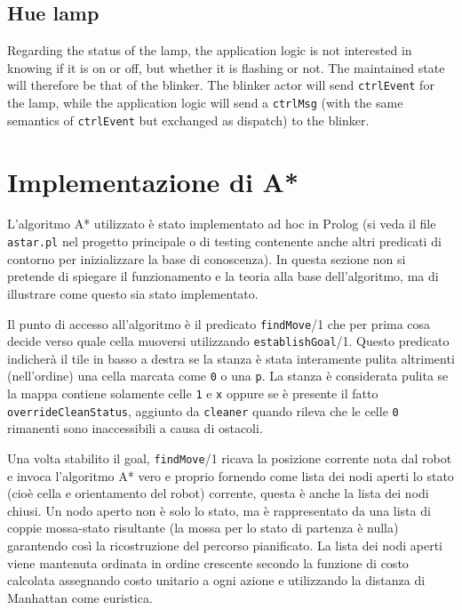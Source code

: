 \subsection{Hue lamp}
Regarding the status of the lamp, the application logic is not interested in knowing if it is on or off, but whether it is flashing or not. The maintained state will therefore be that of the blinker. The blinker actor will send \texttt{ctrlEvent} for the lamp, while the application logic will send a \texttt{ctrlMsg} (with the same semantics of \texttt{ctrlEvent} but exchanged as dispatch) to the blinker.

\section{Implementazione di A*}\label{prt:astar_prolog}
L'algoritmo A* utilizzato è stato implementato ad hoc in Prolog (si veda il file \texttt{astar.pl} nel progetto principale o di testing contenente anche altri predicati di contorno per inizializzare la base di conoscenza). In questa sezione non si pretende di spiegare il funzionamento e la teoria alla base dell'algoritmo, ma di illustrare come questo sia stato implementato.

Il punto di accesso all'algoritmo è il predicato \texttt{findMove}/1 che per prima cosa decide verso quale cella muoversi utilizzando \texttt{establishGoal}/1. Questo predicato indicherà il tile in basso a destra se la stanza è stata interamente pulita altrimenti (nell'ordine) una cella marcata come \texttt{0} o una \texttt{p}.
La stanza è considerata pulita se la mappa contiene solamente celle \texttt{1} e \texttt{x} oppure se è presente il fatto \texttt{overrideCleanStatus}, aggiunto da \texttt{cleaner} quando rileva che le celle \texttt{0} rimanenti sono inaccessibili a causa di ostacoli.

Una volta stabilito il goal, \texttt{findMove}/1 ricava la posizione corrente nota dal robot e invoca l'algoritmo A* vero e proprio fornendo come lista dei nodi aperti lo stato (cioè cella e orientamento del robot) corrente, questa è anche la lista dei nodi chiusi. Un nodo aperto non è solo lo stato, ma è rappresentato da una lista di coppie mossa-stato risultante (la mossa per lo stato di partenza è nulla) garantendo così la ricostruzione del percorso pianificato. La lista dei nodi aperti viene mantenuta ordinata in ordine crescente secondo la funzione di costo calcolata assegnando costo unitario a ogni azione e utilizzando la distanza di Manhattan come euristica.

